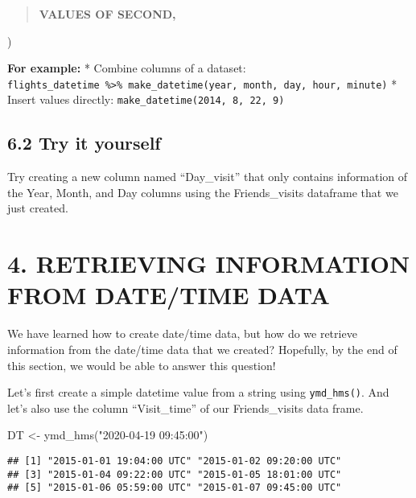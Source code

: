 \documentclass[
]{book}
\newenvironment{Shaded}{\begin{snugshade}}{\end{snugshade}}
\newcommand{\FunctionTok}[1]{\textcolor[rgb]{0.00,0.00,0.00}{#1}}
\newcommand{\NormalTok}[1]{#1}
\newcommand{\OtherTok}[1]{\textcolor[rgb]{0.56,0.35,0.01}{#1}}
\newcommand{\SpecialCharTok}[1]{\textcolor[rgb]{0.00,0.00,0.00}{#1}}
\newcommand{\StringTok}[1]{\textcolor[rgb]{0.31,0.60,0.02}{#1}}
\begin{document}
\begin{quote}
\textbf{VALUES OF SECOND,}
\end{quote}

)

\textbf{For example:}
* Combine columns of a dataset: \texttt{flights\_datetime\ \%\textgreater{}\%\ make\_datetime(year,\ month,\ day,\ hour,\ minute)}
* Insert values directly: \texttt{make\_datetime(2014,\ 8,\ 22,\ 9)}

\hypertarget{try-it-yourself-29}{%
\subsection{6.2 Try it yourself}\label{try-it-yourself-29}}

Try creating a new column named ``Day\_visit'' that only contains information of the Year, Month, and Day columns using the Friends\_visits dataframe that we just created.

\hypertarget{retrieving-information-from-datetime-data}{%
\section{4. RETRIEVING INFORMATION FROM DATE/TIME DATA}\label{retrieving-information-from-datetime-data}}

We have learned how to create date/time data, but how do we retrieve information from the date/time data that we created? Hopefully, by the end of this section, we would be able to answer this question!

Let's first create a simple datetime value from a string using \texttt{ymd\_hms()}. And let's also use the column ``Visit\_time'' of our Friends\_visits data frame.

\begin{Shaded}
\begin{Highlighting}[]
\NormalTok{DT }\OtherTok{\textless{}{-}} \FunctionTok{ymd\_hms}\NormalTok{(}\StringTok{"2020{-}04{-}19 09:45:00"}\NormalTok{)}
\end{Highlighting}
\end{Shaded}

\begin{Shaded}
\end{Shaded}

\begin{verbatim}
## [1] "2015-01-01 19:04:00 UTC" "2015-01-02 09:20:00 UTC"
## [3] "2015-01-04 09:22:00 UTC" "2015-01-05 18:01:00 UTC"
## [5] "2015-01-06 05:59:00 UTC" "2015-01-07 09:45:00 UTC"
\end{verbatim}
\end{document}
